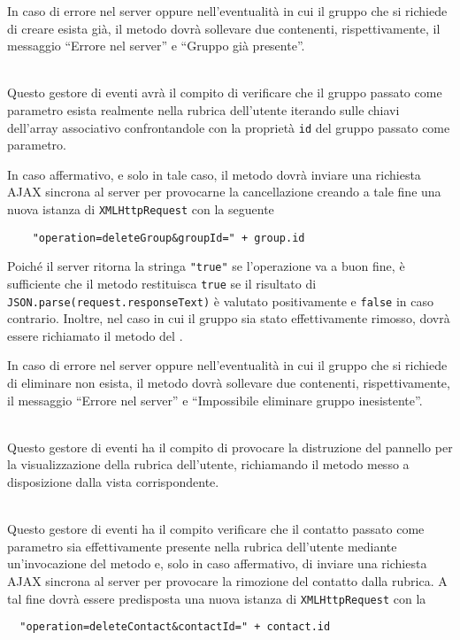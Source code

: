 \begin{description}
In caso di errore nel server oppure nell'eventualità in cui il gruppo che si richiede di creare esista già, il metodo dovrà sollevare due  contenenti, rispettivamente, il messaggio ``Errore nel server'' e ``Gruppo già presente''.

\item{}\\
Questo gestore di eventi avrà il compito di verificare che il gruppo passato come parametro esista realmente nella rubrica dell'utente iterando sulle chiavi dell'array associativo  confrontandole con la proprietà \verb'id' del gruppo passato come parametro.

In caso affermativo, e solo in tale caso, il metodo dovrà inviare una richiesta AJAX sincrona al server per provocarne la cancellazione creando a tale fine una nuova istanza di \verb'XMLHttpRequest' con la seguente 
\begin{verbatim}
    "operation=deleteGroup&groupId=" + group.id
\end{verbatim}

Poiché il server ritorna la stringa \verb'"true"' se l'operazione va a buon fine, è sufficiente che il metodo restituisca \verb'true' se il risultato di \verb'JSON.parse(request.responseText)' è valutato positivamente e \verb'false' in caso contrario. Inoltre, nel caso in cui il gruppo sia stato effettivamente rimosso, dovrà essere richiamato il metodo  del .

In caso di errore nel server oppure nell'eventualità in cui il gruppo che si richiede di eliminare non esista, il metodo dovrà sollevare due  contenenti, rispettivamente, il messaggio ``Errore nel server'' e ``Impossibile eliminare gruppo inesistente''.

\item{}\\
Questo gestore di eventi ha il compito di provocare la distruzione del pannello per la visualizzazione della rubrica dell'utente, richiamando il metodo  messo a disposizione dalla vista corrispondente.

\item{}\\
Questo gestore di eventi ha il compito verificare che il contatto passato come parametro sia effettivamente presente nella rubrica dell'utente mediante un'invocazione del metodo  e, solo in caso affermativo, di inviare una richiesta AJAX sincrona al server per provocare la rimozione del contatto dalla rubrica. A tal fine dovrà essere predisposta una nuova istanza di \verb'XMLHttpRequest' con la 
\begin{verbatim}
  "operation=deleteContact&contactId=" + contact.id
\end{verbatim}


\end{description}
